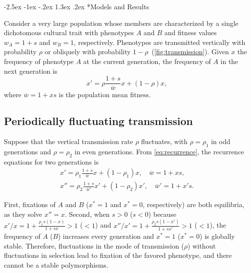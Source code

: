 \documentclass[14pt]{extarticle}
\makeatletter
\renewcommand\section{\@startsection {section}{1}{\z@}%
     {-2.5ex \@plus -1ex \@minus -.2ex}%
     {1.3ex \@plus.2ex}%
    {\Large\bfseries}}
\makeatother
\begin{document}


\section*{Models and Results}

Consider a very large population whose members are characterized by a single dichotomous cultural trait with phenotypes $A$ and $B$ and fitness values $w_A=1+s$ and $w_B=1$, respectively.
Phenotypes are transmitted vertically with probability $\rho$ or obliquely with probability $1-\rho$~(\autoref{fig:transmission}).
Given $x$ the frequency of phenotype $A$ at the current generation, the frequency of $A$ in the next generation is
\begin{equation} \label{eq:recurrence}
x' = \rho \frac{1+s}{\overline w} x + (1-\rho)x,
\end{equation}
where $\overline w = 1 + xs$ is the population mean fitness.

\subsection*{Periodically fluctuating transmission}

Suppose that the vertical transmission rate $\rho$ fluctuates, with $\rho = \rho_1$ in odd generations and $\rho = \rho_2$ in even generations.
From \eqref{eq:recurrence}, the recurrence equations for two generations is
\begin{equation}\begin{aligned} \label{eq:recurrence_two_generations}
x' = \rho_1 \frac{1+s}{\overline w} x + (1-\rho_1)x, \quad \overline w = 1 + xs, \\
x'' = \rho_2 \frac{1+s}{\overline w'} x' + (1-\rho_2)x', \quad \overline w' = 1 + x's.
\end{aligned}\end{equation}

First, fixations of $A$ and $B$ ($x^*=1$ and $x^*=0$, respectively) are both equilibria, as they solve $x''=x$.
Second, when $s>0$ ($s<0$) because $x'/x = 1+\frac{\rho_1 s (1-x)}{1+sx} > 1$ ($<1$) and $x''/x' = 1+\frac{\rho_2 s (1-x')}{1+sx'} > 1$ ($<1$), the frequency of $A$ ($B$) increases every generation and $x^*=1$ ($x^*=0$) is globally stable.
Therefore, fluctuations in the mode of transmission ($\rho$) without fluctuations in selection lead to fixation of the favored phenotype, and there cannot be a stable polymorphisms.
\end{document}
